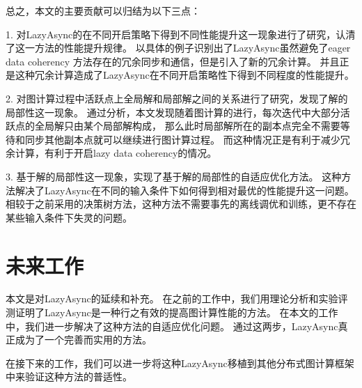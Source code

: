 总之，本文的主要贡献可以归结为以下三点：


1. 对LazyAsync的在不同开启策略下得到不同性能提升这一现象进行了研究，认清了这一方法的性能提升规律。
以具体的例子识别出了LazyAsync虽然避免了eager data coherency 方法存在的冗余同步和通信，但是引入了新的冗余计算。
并且正是这种冗余计算造成了LazyAsync在不同开启策略性下得到不同程度的性能提升。

2. 对图计算过程中活跃点上全局解和局部解之间的关系进行了研究，发现了解的局部性这一现象。
通过分析，本文发现随着图计算的进行，每次迭代中大部分活跃点的全局解只由某个局部解构成，
那么此时局部解所在的副本点完全不需要等待和同步其他副本点就可以继续进行图计算过程。
而这种情况正是有利于减少冗余计算，有利于开启lazy data coherency的情况。

3. 基于解的局部性这一现象，实现了基于解的局部性的自适应优化方法。
这种方法解决了LazyAsync在不同的输入条件下如何得到相对最优的性能提升这一问题。
相较于之前采用的决策树方法，这种方法不需要事先的离线调优和训练，更不存在某些输入条件下失灵的问题。

\section{未来工作}

本文是对LazyAsync的延续和补充。
在之前的工作中，我们用理论分析和实验评测证明了LazyAsync是一种行之有效的提高图计算性能的方法。
在本文的工作中，我们进一步解决了这种方法的自适应优化问题。
通过这两步，LazyAsync真正成为了一个完善而实用的方法。

在接下来的工作，我们可以进一步将这种LazyAsync移植到其他分布式图计算框架中来验证这种方法的普适性。


